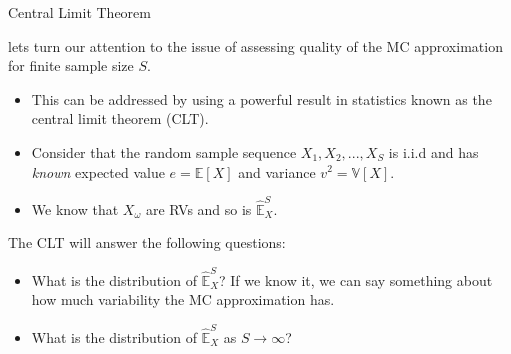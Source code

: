 \documentclass[9pt]{beamer}
\begin{document}
%
\begin{frame}{Central Limit Theorem}

lets turn our attention to the issue of assessing quality of the MC approximation for finite sample size $S$. 
\begin{itemize}
\item This can be addressed by using a powerful result in statistics known as the central limit theorem (CLT). 
\item Consider that the random sample sequence $X_1,X_2,...,X_S$ is i.i.d and has {\em known} expected value $e=\mathbb{E}[X]$ and variance $v^2=\mathbb{V}[X]$. 

\item We know that $X_\omega$ are RVs and so is $\hat{\mathbb{E}}_X^S$. 
\end{itemize}

The CLT will answer the following questions:
\begin{block}{}
\begin{itemize}
\item What is the distribution of $\hat{\mathbb{E}}_X^S$? If we know it, we can say something about how much variability the MC  approximation has. 

\item What is the distribution of $\hat{\mathbb{E}}_X^S$ as $S\to \infty$? 
\end{itemize}
\end{block}

\end{frame}
\end{document}
